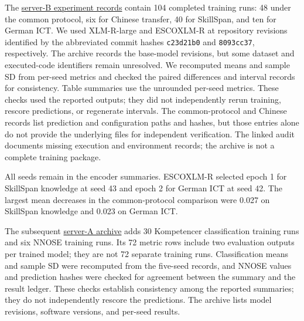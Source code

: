 The \href{https://github.com/AlfredJamesLi/chinese-skillspan-benchmark/tree/46d1166f8e11dd52d473f645536074bb8dd0a53c/results_snapshots/external_benchmarks_20260922}{server-B experiment records} contain 104 completed training runs: 48 under the common protocol, six for Chinese transfer, 40 for SkillSpan, and ten for German ICT. We used XLM-R-large and ESCOXLM-R at repository revisions identified by the abbreviated commit hashes \texttt{c23d21b0} and \texttt{8093cc37}, respectively. The archive records the base-model revisions, but some dataset and executed-code identifiers remain unresolved. We recomputed means and sample SD from per-seed metrics and checked the paired differences and interval records for consistency. Table summaries use the unrounded per-seed metrics. These checks used the reported outputs; they did not independently rerun training, rescore predictions, or regenerate intervals. The common-protocol and Chinese records list prediction and configuration paths and hashes, but those entries alone do not provide the underlying files for independent verification. The linked audit documents missing execution and environment records; the archive is not a complete training package.

All seeds remain in the encoder summaries. ESCOXLM-R selected epoch 1 for SkillSpan knowledge at seed 43 and epoch 2 for German ICT at seed 42. The largest mean decreases in the common-protocol comparison were 0.027 on SkillSpan knowledge and 0.023 on German ICT.

The subsequent \href{https://github.com/AlfredJamesLi/chinese-skillspan-benchmark/tree/b84f218b7142c97ab03a60499a9b30e7ec332cab/results_snapshots/a_native_20260924}{server-A archive} adds 30 Kompetencer classification training runs and six NNOSE training runs. Its 72 metric rows include two evaluation outputs per trained model; they are not 72 separate training runs. Classification means and sample SD were recomputed from the five-seed records, and NNOSE values and prediction hashes were checked for agreement between the summary and the result ledger. These checks establish consistency among the reported summaries; they do not independently rescore the predictions. The archive lists model revisions, software versions, and per-seed results.


\FloatBarrier

\FloatBarrier
